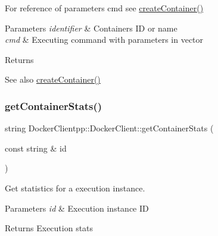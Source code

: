 For reference of parameters cmd see \mbox{\hyperlink{classDockerClientpp_1_1DockerClient_a0bef0244ed9468797267bef38252cc62}{create\+Container()}}


\begin{DoxyParams}{Parameters}
{\em identifier} & Container\textquotesingle{}s ID or name \\
\hline
{\em cmd} & Executing command with parameters in vector \\
\hline
\end{DoxyParams}
\begin{DoxyReturn}{Returns}

\end{DoxyReturn}
\begin{DoxySeeAlso}{See also}
\mbox{\hyperlink{classDockerClientpp_1_1DockerClient_a0bef0244ed9468797267bef38252cc62}{create\+Container()}} 
\end{DoxySeeAlso}
\mbox{\label{classDockerClientpp_1_1DockerClient_ab1952a285f13640ceb9b1d461fc5341d}} 
\subsubsection{\texorpdfstring{getContainerStats()}{getContainerStats()}}
{\footnotesize\ttfamily string Docker\+Clientpp\+::\+Docker\+Client\+::get\+Container\+Stats (\begin{DoxyParamCaption}\item[{const string \&}]{id }\end{DoxyParamCaption})}



Get statistics for a execution instance. 


\begin{DoxyParams}{Parameters}
{\em id} & Execution instance ID \\
\hline
\end{DoxyParams}
\begin{DoxyReturn}{Returns}
Execution stats 
\end{DoxyReturn}
\mbox{\label{classDockerClientpp_1_1DockerClient_a4865724c738b0454243b218fe2f72af8}} 
